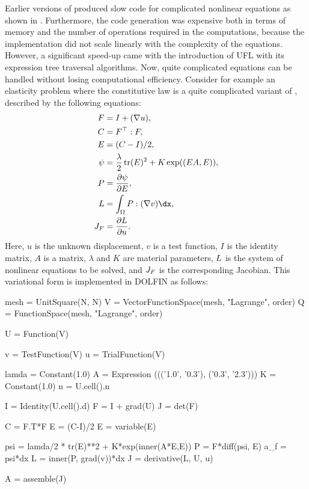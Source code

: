 Earlier versions of \sfc{} produced slow code for complicated nonlinear
equations as shown in \citet{AlnaesMardal2009b}. Furthermore, the code
generation was expensive both in terms of memory and the number of
operations required in the computations, because the \sfc{} implementation
did not scale linearly with the complexity of the equations.  However, a
significant speed-up came with the introduction of UFL with its expression
tree traversal algorithms.  Now, quite complicated equations can be
handled without losing computational efficiency. Consider for example
an elasticity problem where the constitutive law is a quite complicated
variant of \citet{Fung1993}, described by the following equations:
%
\begin{align}
F &= I + (\nabla u), \\
C &= F^{\top}: F, \\
E &= (C-I)/2, \\
\psi &= \frac{\lambda}{2} \, \mbox{tr}(E)^2 + K\exp((E A,E)), \\
P &= \frac{\partial \psi}{\partial E}, \\
\LL &= \int_\Omega P: (\nabla v) \dx, \\
\JJ_F &= \frac{\partial \LL}{\partial u}.
\end{align}
Here, $u$ is the unknown displacement, $v$ is a
test function, $I$ is the identity matrix, $A$ is a
matrix, $\lambda$ and $K$ are material parameters, $L$ is the system
of nonlinear equations to be solved, and $J_F$ is the corresponding
Jacobian.  This variational form is implemented in DOLFIN as follows:
\begin{python}
mesh = UnitSquare(N, N)
V = VectorFunctionSpace(mesh, "Lagrange", order)
Q = FunctionSpace(mesh, "Lagrange", order)

U = Function(V)

v = TestFunction(V)
u = TrialFunction(V)

lamda = Constant(1.0)
A = Expression ((('1.0', '0.3'), ('0.3', '2.3')))
K = Constant(1.0)
n = U.cell().n

I = Identity(U.cell().d)
F = I + grad(U)
J = det(F)

C = F.T*F
E = (C-I)/2
E = variable(E)

psi = lamda/2 * tr(E)**2  +  K*exp(inner(A*E,E))
P = F*diff(psi, E)
a_f = psi*dx
L = inner(P, grad(v))*dx
J = derivative(L, U, u)

A = assemble(J)
\end{python}

